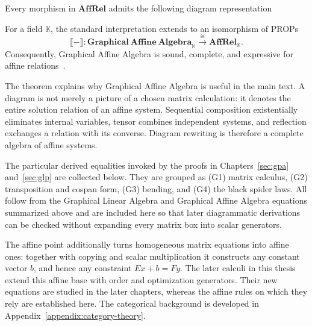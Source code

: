 \begin{remark}
    Every morphism in $\textbf{AffRel}$ admits the following diagram representation
    \begin{figure}[h]
    \centering
    \end{figure}
\end{remark}

\begin{theorem}\label{thm:appendix-gla-presentation}
For a field $\mathbb K$, the standard interpretation extends to an isomorphism
of PROPs
\[
 \llbracket{-}\rrbracket:
 \mathbf{Graphical\ Affine\ Algebra}_{\mathbb K}\xrightarrow{\ \cong\ }
 \mathbf{AffRel}_{\mathbb K}.
\]
Consequently, Graphical Affine Algebra is sound, complete, and expressive for affine
relations~\cite{bonchi2019affine}.
\end{theorem}

The theorem explains why Graphical Affine Algebra is useful in the main text.  A diagram is not
merely a picture of a chosen matrix calculation: it denotes the entire
solution relation of an affine system.  Sequential composition existentially
eliminates internal variables, tensor combines independent systems, and
reflection exchanges a relation with its converse.  Diagram rewriting is
therefore a complete algebra of affine systems.

The particular derived equalities invoked by the proofs in
Chapters~\ref{sec:gpa} and~\ref{sec:glp} are collected below.  They are grouped
as (G1) matrix calculus, (G2) transposition and cospan form, (G3) bending, and
(G4) the black spider laws.  All follow from the Graphical Linear Algebra and Graphical Affine Algebra equations summarized above and
are included here so that later diagrammatic derivations can be checked without
expanding every matrix box into scalar generators.



The affine point additionally turns homogeneous matrix equations into affine
ones: together with copying and scalar multiplication it constructs any
constant vector $b$, and hence any constraint $Ex+b=Fy$.  The later calculi in
this thesis extend this affine base with order and optimization generators.
Their new equations are studied in the later chapters, whereas the affine
rules on which they rely are established here. The categorical background
is developed in Appendix~\ref{appendix:category-theory}.
